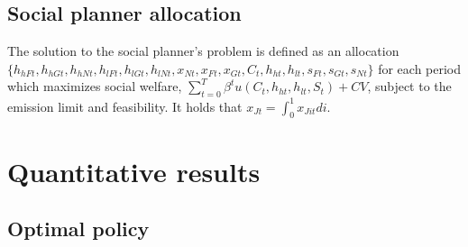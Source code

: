 \subsection{Social planner allocation}\label{app:sp_prob} The solution to the social planner's problem is defined as an allocation \\ $\{h_{hFt}, h_{hGt}, h_{hNt}, h_{lFt}, h_{lGt}, h_{lNt}, x_{Nt}, x_{Ft}, x_{Gt}, C_t,  h_{ht}, h_{lt}, s_{Ft}, s_{Gt}, s_{Nt} \}$ for each period which maximizes social welfare, $\sum_{t=0}^{T}\beta^t u(C_{t}, h_{ht}, h_{lt}, S_{t})+ CV$, subject to the emission limit and feasibility. 
It holds that $x_{Jt}=\int_{0}^{1}x_{Jit}di$.

\section{Quantitative results}\label{app:quant_res}



\subsection{Optimal policy}\label{app:quant_res_opt}


